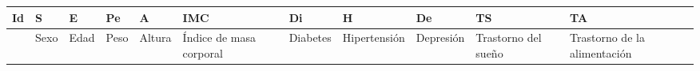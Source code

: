 \documentclass[
  spanish,
  letterpaper,
]{scrbook}
\theoremstyle{definition}
\theoremstyle{remark}
\begin{document}
\begin{tcolorbox}
\begin{longtable}[]{@{}
  >{\raggedright\arraybackslash}p{}
  >{\raggedright\arraybackslash}p{}
  >{\raggedright\arraybackslash}p{}
  >{\raggedright\arraybackslash}p{}
  >{\raggedright\arraybackslash}p{}
  >{\raggedright\arraybackslash}p{}
  >{\raggedright\arraybackslash}p{}
  >{\raggedright\arraybackslash}p{}
  >{\raggedright\arraybackslash}p{}
  >{\raggedright\arraybackslash}p{}
  >{\raggedright\arraybackslash}p{}@{}}
\toprule\noalign{}
\begin{minipage}[b]{\linewidth}\raggedright
Id
\end{minipage} & \begin{minipage}[b]{\linewidth}\raggedright
S
\end{minipage} & \begin{minipage}[b]{\linewidth}\raggedright
E
\end{minipage} & \begin{minipage}[b]{\linewidth}\raggedright
Pe
\end{minipage} & \begin{minipage}[b]{\linewidth}\raggedright
A
\end{minipage} & \begin{minipage}[b]{\linewidth}\raggedright
IMC
\end{minipage} & \begin{minipage}[b]{\linewidth}\raggedright
Di
\end{minipage} & \begin{minipage}[b]{\linewidth}\raggedright
H
\end{minipage} & \begin{minipage}[b]{\linewidth}\raggedright
De
\end{minipage} & \begin{minipage}[b]{\linewidth}\raggedright
TS
\end{minipage} & \begin{minipage}[b]{\linewidth}\raggedright
TA
\end{minipage} \\
\midrule\noalign{}
\endhead
\bottomrule\noalign{}
\endlastfoot
& Sexo & Edad & Peso & Altura & Índice de masa corporal & Diabetes &
Hipertensión & Depresión & Trastorno del sueño & Trastorno de la
alimentación \\
\end{longtable}


\end{tcolorbox}
\end{document}
